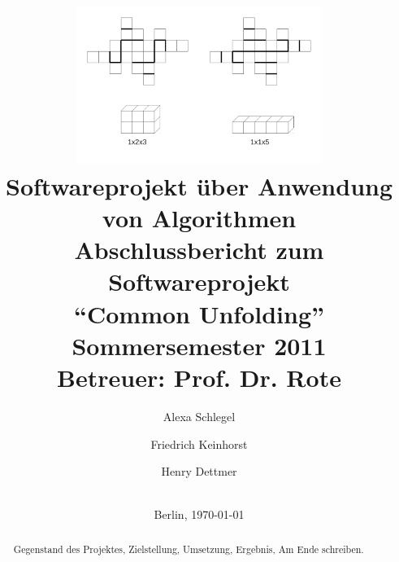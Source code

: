 \documentclass[a4paper,11pt]{scrartcl}
\title{
  \includegraphics[width=0.6\textwidth]{03_pics/commonUnfold_beispiel1.pdf}\\
  [4ex]
  {
  \normalsize Softwareprojekt über Anwendung von Algorithmen\\
  [2ex]
  }
  Abschlussbericht zum Softwareprojekt\\
  \enquote{Common Unfolding}\\
  [4ex]
  {\normalsize Sommersemester 2011}\\
  {\normalsize Betreuer: Prof. Dr. Rote}\\
  [4ex]
}
\author{Alexa Schlegel\\\mailto{alexa.schlegel@gmail.com} \and Friedrich Keinhorst\\\mailto{fkeinhorst@gmail.com} \and Henry Dettmer\\\mailto{henrydettmer@gmail.com}\\[4ex]
}
\date{Berlin, \today}
\begin{document}
\begin{titlepage}

\maketitle
\thispagestyle{empty}

\vfill{}
\end{titlepage}

\pagestyle{empty}
\clearpage{}

\tableofcontents
\clearpage

\pagestyle{fancy}
\setcounter{page}{1}

\begin{abstract}
Gegenstand des Projektes, Zielstellung, Umsetzung, Ergebnis, Am Ende
schreiben.
\end{abstract}
\clearpage



\clearpage


\clearpage


\clearpage


\clearpage


\clearpage







\nocite{*} 



\clearpage


\listoffigures
{}
\clearpage

\listoftables
{}
\end{document}
